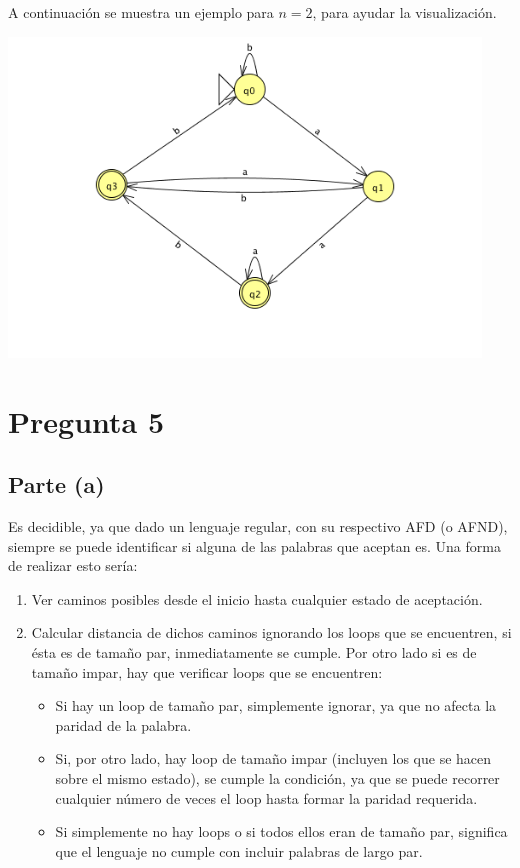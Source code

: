 \documentclass[11pt,letterpaper]{article}
\begin{document}
A continuación se muestra un ejemplo para $n = 2$, para ayudar la visualización.

\includegraphics[height=8.5cm]{tarea_4-b.png}


\section{Pregunta 5}
\subsection{Parte (a)}
Es decidible, ya que dado un lenguaje regular, con su respectivo AFD (o AFND), siempre se puede identificar si alguna de las palabras que aceptan es. Una forma de realizar esto sería:

\begin{enumerate}
	\item Ver caminos posibles desde el inicio hasta cualquier estado de aceptación.
	\item Calcular distancia de dichos caminos ignorando los loops que se encuentren, si ésta es de tamaño par, inmediatamente se cumple. Por otro lado si es de tamaño impar, hay que verificar loops que se encuentren:
	\begin{itemize}
		\item Si hay un loop de tamaño par, simplemente ignorar, ya que no afecta la paridad de la palabra.
		\item Si, por otro lado, hay loop de tamaño impar (incluyen los que se hacen sobre el mismo estado), se cumple la condición, ya que se puede recorrer cualquier número de veces el loop hasta formar la paridad requerida.
		\item Si simplemente no hay loops o si todos ellos eran de tamaño par, significa que el lenguaje no cumple con incluir palabras de largo par.
	\end{itemize}
\end{enumerate}
\end{document}
